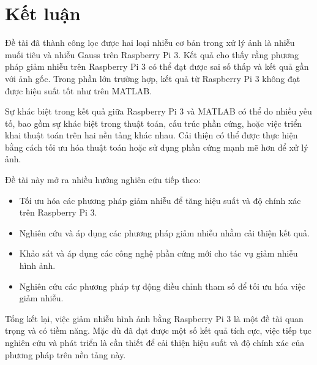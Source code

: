 \pagebreak
\section{Kết luận}

Đề tài đã thành công lọc được hai loại nhiễu cơ bản trong xử lý ảnh là nhiễu muối tiêu và nhiễu Gauss trên Raspberry Pi 3.
Kết quả cho thấy rằng phương pháp giảm nhiễu trên Raspberry Pi 3 có thể đạt được sai số thấp và kết quả gần với ảnh gốc. 
Trong phần lớn trường hợp, kết quả từ Raspberry Pi 3 không đạt được hiệu suất tốt như trên MATLAB.

Sự khác biệt trong kết quả giữa Raspberry Pi 3 và MATLAB có thể do nhiều yếu tố, 
bao gồm sự khác biệt trong thuật toán, cấu trúc phần cứng, hoặc việc triển khai thuật toán trên hai nền tảng khác nhau. 
Cải thiện có thể được thực hiện bằng cách tối ưu hóa thuật toán hoặc sử dụng phần cứng mạnh mẽ hơn để xử lý ảnh.

Đề tài này mở ra nhiều hướng nghiên cứu tiếp theo:
\begin{itemize}
    \item Tối ưu hóa các phương pháp giảm nhiễu để tăng hiệu suất và độ chính xác trên Raspberry Pi 3. 
    \item Nghiên cứu và áp dụng các phương pháp giảm nhiễu nhằm cải thiện kết quả. 
    \item Khảo sát và áp dụng các công nghệ phần cứng mới cho tác vụ giảm nhiễu hình ảnh.
    \item Nghiên cứu các phương pháp tự động điều chỉnh tham số để tối ưu hóa việc giảm nhiễu.
\end{itemize}

Tổng kết lại, việc giảm nhiễu hình ảnh bằng Raspberry Pi 3 là một đề tài quan trọng và có tiềm năng. 
Mặc dù đã đạt được một số kết quả tích cực, việc tiếp tục nghiên cứu và phát triển là cần thiết để cải thiện hiệu suất và độ chính xác của phương pháp trên nền tảng này.
